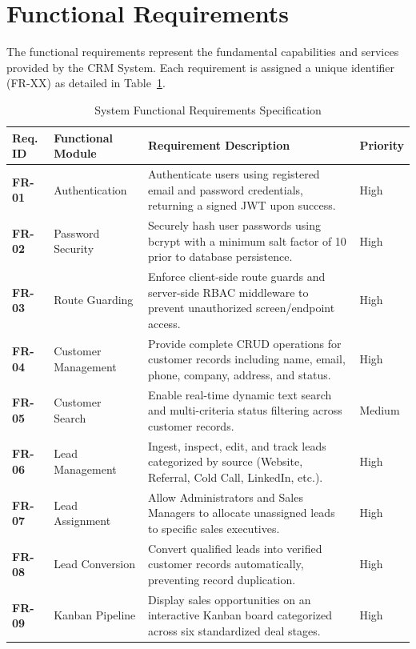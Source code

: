 \section{Functional Requirements}
The functional requirements represent the fundamental capabilities and services provided by the CRM System. Each requirement is assigned a unique identifier (FR-XX) as detailed in Table~\ref{tab:functional_requirements}.

\begin{table}[h!]
\centering
\caption{System Functional Requirements Specification}
\label{tab:functional_requirements}
\renewcommand{\arraystretch}{1.25}
\begin{tabular}{|p{1.8cm}|p{4.2cm}|p{6.8cm}|p{1.7cm}|}
\hline
\textbf{Req. ID} & \textbf{Functional Module} & \textbf{Requirement Description} & \textbf{Priority} \\ \hline
\textbf{FR-01} & Authentication & Authenticate users using registered email and password credentials, returning a signed JWT upon success. & High \\ \hline
\textbf{FR-02} & Password Security & Securely hash user passwords using bcrypt with a minimum salt factor of 10 prior to database persistence. & High \\ \hline
\textbf{FR-03} & Route Guarding & Enforce client-side route guards and server-side RBAC middleware to prevent unauthorized screen/endpoint access. & High \\ \hline
\textbf{FR-04} & Customer Management & Provide complete CRUD operations for customer records including name, email, phone, company, address, and status. & High \\ \hline
\textbf{FR-05} & Customer Search & Enable real-time dynamic text search and multi-criteria status filtering across customer records. & Medium \\ \hline
\textbf{FR-06} & Lead Management & Ingest, inspect, edit, and track leads categorized by source (Website, Referral, Cold Call, LinkedIn, etc.). & High \\ \hline
\textbf{FR-07} & Lead Assignment & Allow Administrators and Sales Managers to allocate unassigned leads to specific sales executives. & High \\ \hline
\textbf{FR-08} & Lead Conversion & Convert qualified leads into verified customer records automatically, preventing record duplication. & High \\ \hline
\textbf{FR-09} & Kanban Pipeline & Display sales opportunities on an interactive Kanban board categorized across six standardized deal stages. & High \\ \hline

\end{tabular}
\end{table}
